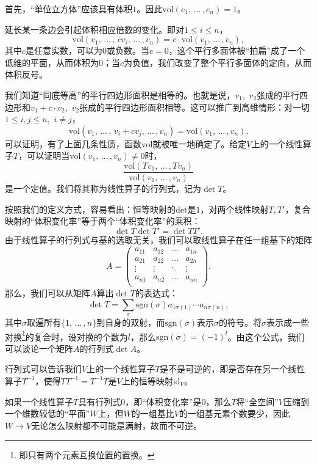 首先，“单位立方体”应该具有体积$1$。因此$\mathrm{vol}(e_1,\,\dots\,,e_n)=1$。

延长某一条边会引起体积相应倍数的变化。即对$1\leqslant  i\leqslant  n$，
\[\mathrm{vol}(v_1,\,\dots\,,\,cv_i,\,\dots\,,v_n)=c\cdot \mathrm{vol}(v_1,\,\dots\,,v_n),\]
其中$c$是任意实数，可以为$0$或负数。当$c=0$，这个平行多面体被“拍扁”成了一个低维的平面，从而体积为$0$；当$c$为负值，我们改变了整个平行多面体的定向，从而体积反号。

我们知道“同底等高”的平行四边形面积是相等的。也就是说，$v_1$,~$v_2$张成的平行四边形和$v_1+c\cdot v_2$,~$v_2$张成的平行四边形面积相等。这可以推广到高维情形：对一切$1\leqslant  i,j\leqslant  n$,~$i\neq j$，
\[\mathrm{vol}(v_1,\,\dots\,,\,v_i+c v_j,\,\dots\,,v_n)=\mathrm{vol}(v_1,\,\dots\,,v_n).\]
可以证明，有了上面几条性质，函数$\mathrm{vol}$就被唯一地确定了。给定$V$上的一个线性算子$T$，可以证明当$\mathrm{vol}(v_1,\,\dots\,,v_n)\neq 0$时，
\[\frac{\mathrm{vol}(Tv_1,\,\dots\,,Tv_n)}{\mathrm{vol}(v_1,\,\dots\,,v_n)}\]
是一个定值。我们将其称为线性算子的行列式，记为$\det T$。

按照我们的定义方式，容易看出：恒等映射的$\mathrm{det}$是$1$，对两个线性映射$T,T'$，复合映射的“体积变化率”等于两个“体积变化率”的乘积：
\[\det T\det T'=\det TT'.\]
由于线性算子的行列式与基的选取无关，我们可以取线性算子在任一组基下的矩阵
\[A =
    \begin{pmatrix}
        a_{11} & a_{12} & \ldots & a_{1n} \\
        a_{21} & a_{22} & \ldots & a_{2n} \\
        \vdots & \vdots & \ddots & \vdots \\
        a_{n1} & a_{n2} & \ldots & a_{nn} \\
    \end{pmatrix}. \]
那么，我们可以从矩阵$A$算出$\det T$的表达式：
\[\det T=\sum_{\sigma}\mathrm{sgn}(\sigma)a_{1\sigma(1)}\cdots a_{n\sigma(n)},\]
其中$\sigma$取遍所有$\{1,\,\dots\,,n\}$到自身的双射，而$\mathrm{sgn}(\sigma)$表示$\sigma$的符号。将$\sigma$表示成一些对换\footnote{即只有两个元素互换位置的置换。}的复合时，设对换的个数为$l$，那么$\mathrm{sgn}(\sigma)=(-1)^l$。由这个公式，我们可以谈论一个矩阵$A$的行列式$\det A$。

行列式可以告诉我们$V$上的一个线性算子$T$是不是可逆的，即是否存在另一个线性算子$T^{-1}$，使得$TT^{-1}=T^{-1}T$是$V$上的恒等映射$\mathrm{id}_V$。

如果一个线性算子$T$具有行列式$0$，即“体积变化率”是$0$，那么$T$将“全空间”$V$压缩到一个维数较低的“平面”$W$上，但$W$的一组基比$V$的一组基元素个数要少，因此$W\to V$无论怎么映射都不可能是满射，故而不可逆。

